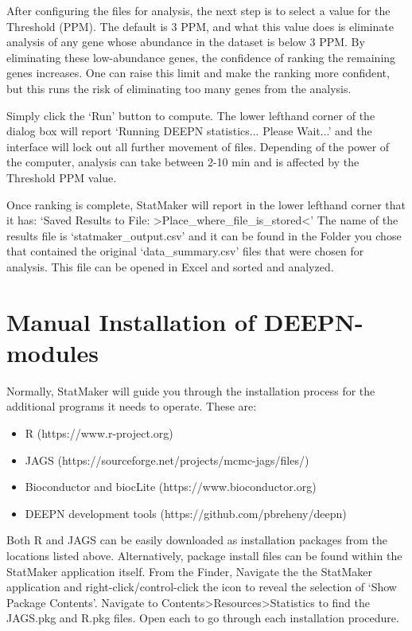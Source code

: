 \documentclass[11pt,fleqn]{book} %
\newcommand{\StatMaker}{{\color{Dandelion} StatMaker }}
\begin{document}
After configuring the files for analysis, the next step is to select a value for the Threshold (PPM).  The default is 3 PPM, and what this value does is eliminate analysis of any gene whose abundance in the dataset is below 3 PPM.  By eliminating these low-abundance genes, the confidence of ranking the remaining genes increases.  One can raise this limit and make the ranking more confident, but this runs the risk of eliminating too many genes from the analysis.  

Simply click the ‘Run’ button to compute.
The lower lefthand corner of the dialog box will report
‘Running DEEPN statistics... Please Wait...’ and the interface will lock out all further movement of files.  Depending of the power of the computer, analysis can take between 2-10 min and is affected by the Threshold PPM value.

Once ranking is complete, \StatMaker will report in the lower lefthand corner that it has:
‘Saved Results to File: >Place\_where\_file\_is\_stored<’
The name of the results file is ‘statmaker\_output.csv’ and it can be found in the Folder you chose that contained the original ‘data\_summary.csv’ files that were chosen for analysis.  This file can be opened in Excel and sorted and analyzed.



\section{Manual Installation of DEEPN-modules}

Normally, \StatMaker will guide you through the installation process for the additional programs it needs to operate.  These are:
\begin{itemize}
    \item R  (https://www.r-project.org)
    \item JAGS (https://sourceforge.net/projects/mcmc-jags/files/)
    \item Bioconductor and biocLite (https://www.bioconductor.org)
    \item DEEPN development tools (https://github.com/pbreheny/deepn)
\end{itemize}

Both R and JAGS can be easily downloaded as installation packages from the locations listed above.
Alternatively, package install files can be found within the \StatMaker application itself.
From the Finder, Navigate the the \StatMaker application and right-click/control-click the icon to reveal the selection of ‘Show Package Contents’.  Navigate to Contents>Resources>Statistics to find the JAGS.pkg and R.pkg files.  Open each to go through each installation procedure.
\end{document}

